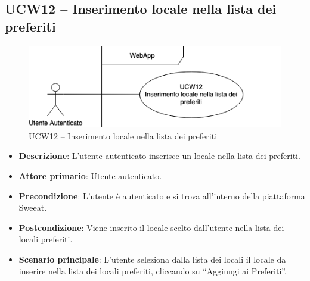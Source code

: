 \subsection{UCW12 – Inserimento locale nella lista dei preferiti}
\begin{figure}[!h]
\centering
    \includegraphics[scale=0.5]{UC_images/UCW12.png} 
    \caption{UCW12 – Inserimento locale nella lista dei preferiti}
\end{figure}
\begin{itemize}
    \item \textbf{Descrizione}: L'utente autenticato inserisce un locale nella lista dei preferiti.
    \item \textbf{Attore primario}: Utente autenticato.
    \item \textbf{Precondizione}: L'utente è autenticato e si trova all’interno della piattaforma Sweeat.
    \item \textbf{Postcondizione}: Viene inserito il locale scelto dall’utente nella lista dei locali preferiti.
    \item \textbf{Scenario principale}: L’utente seleziona dalla lista dei locali il locale da inserire nella lista dei locali preferiti, cliccando su “Aggiungi ai Preferiti”.
\end{itemize}

